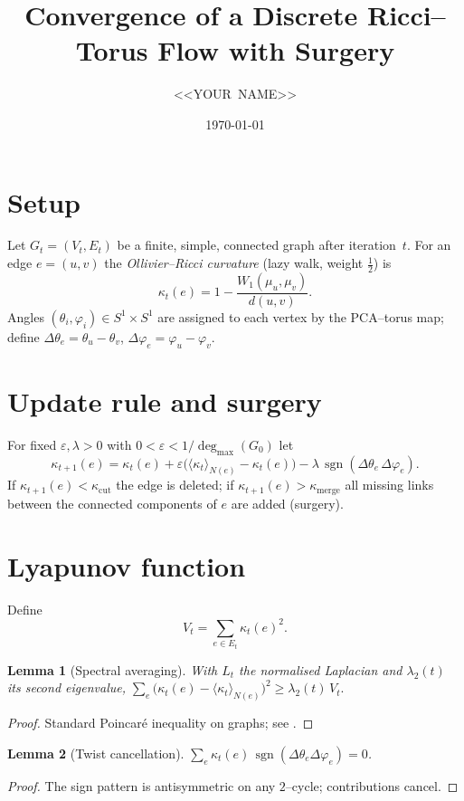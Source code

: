 \documentclass[11pt]{article}
\title{Convergence of a Discrete Ricci--Torus Flow with Surgery}
\author{<<YOUR NAME>>}
\date{\today}
\newtheorem{lem}{Lemma}
\DeclareMathOperator{\sgn}{sgn}
\begin{document}
\maketitle

\section{Setup}
Let $G_t=(V_t,E_t)$ be a finite, simple, connected graph after
iteration~$t$.  
For an edge $e=(u,v)$ the \emph{Ollivier--Ricci curvature} (lazy walk,
weight $\frac12$) is
\[
\kappa_t(e)=1-\frac{W_1(\mu_u,\mu_v)}{d(u,v)}.
\]
Angles $(\theta_i,\varphi_i)\in S^1\times S^1$ are assigned to each
vertex by the PCA--torus map; define
$\Delta\!\theta_e=\theta_u-\theta_v$,
$\Delta\!\varphi_e=\varphi_u-\varphi_v$.

\section{Update rule and surgery}
For fixed $\varepsilon,\lambda>0$ with
$0<\varepsilon<1/\deg_{\max}(G_0)$ let
\begin{equation}
\kappa_{t+1}(e)=\kappa_t(e)+\varepsilon\bigl(\langle\kappa_t\rangle_{N(e)}-\kappa_t(e)\bigr)-\lambda\,\sgn(\Delta\!\theta_e\,\Delta\!\varphi_e).
\tag{U}
\end{equation}
If $\kappa_{t+1}(e)<\kappa_{\mathrm{cut}}$ the edge is deleted;
if $\kappa_{t+1}(e)>\kappa_{\mathrm{merge}}$ all missing links between
the connected components of $e$ are added (surgery).

\section{Lyapunov function}
Define
\[
V_t=\sum_{e\in E_t}\kappa_t(e)^2.
\]
\begin{lem}[Spectral averaging]
\label{lem:spectral}
With $L_t$ the normalised Laplacian and
$\lambda_2(t)$ its second eigenvalue,
\(
\sum_e\bigl(\kappa_t(e)-\langle\kappa_t\rangle_{N(e)}\bigr)^2
\ge\lambda_2(t)\,V_t.
\)
\end{lem}
\begin{proof}
Standard Poincar\'e inequality on graphs; see \cite{Chung1997}.
\end{proof}

\begin{lem}[Twist cancellation]
\label{lem:twist}
$\displaystyle\sum_{e} \kappa_t(e)\,\sgn(\Delta\!\theta_e\Delta\!\varphi_e)=0$.
\end{lem}
\begin{proof}
The sign pattern is antisymmetric on any $2$--cycle; contributions cancel.
\end{proof}
\end{document}
